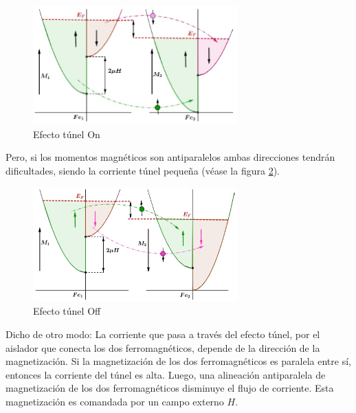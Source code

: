 \begin{figure}[H]
    \centering
    \includegraphics[width=0.7\textwidth]{./Figures/fig347}
	\caption{Efecto túnel On}
	\label{fig:347}
\end{figure}


Pero, si los momentos magnéticos son antiparalelos ambas direcciones tendrán dificultades, siendo la corriente túnel pequeña (véase la figura \ref{fig:348}). 

\begin{figure}[H]
    \centering
    \includegraphics[width=0.7\textwidth]{./Figures/fig348}
	\caption{Efecto túnel Off}
	\label{fig:348}
\end{figure}

Dicho de otro modo: La corriente que pasa a través del efecto túnel, por el aislador que conecta los dos ferromagnéticos, depende de la dirección de la magnetización. Si la magnetización de los dos ferromagnéticos es paralela entre sí, entonces la corriente del túnel es alta. Luego, una alineación antiparalela de magnetización de los dos ferromagnéticos disminuye el flujo de corriente. Esta magnetización es comandada por un campo externo $H$.

